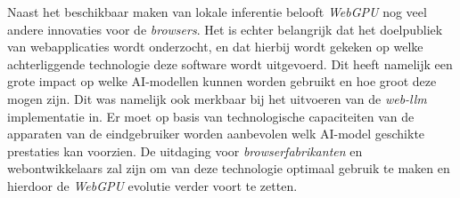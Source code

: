 Naast het beschikbaar maken van lokale inferentie belooft \textit{WebGPU} nog veel andere innovaties voor de \textit{browsers}. Het is echter belangrijk dat het doelpubliek van webapplicaties wordt onderzocht, en dat hierbij wordt gekeken op welke achterliggende technologie deze software wordt uitgevoerd. Dit heeft namelijk een grote impact op welke AI-modellen kunnen worden gebruikt en hoe groot deze mogen zijn. Dit was namelijk ook merkbaar bij het uitvoeren van de \textit{web-llm} implementatie in. Er moet op basis van technologische capaciteiten van de apparaten van de eindgebruiker worden aanbevolen welk AI-model geschikte prestaties kan voorzien. De uitdaging voor \textit{browserfabrikanten} en webontwikkelaars zal zijn om van deze technologie optimaal gebruik te maken en hierdoor de \textit{WebGPU} evolutie verder voort te zetten.